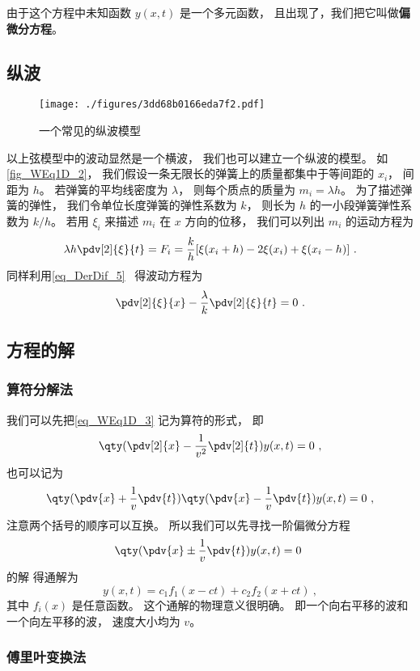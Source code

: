 由于这个方程中未知函数 $y(x,t)$ 是一个多元函数， 且出现了，我们把它叫做\textbf{偏微分方程}。

\subsection{纵波}

\begin{figure}[ht]
\centering
\texttt{[image: ./figures/3dd68b0166eda7f2.pdf]}
\caption{一个常见的纵波模型} \label{fig_WEq1D_2}
\end{figure}

以上弦模型中的波动显然是一个横波， 我们也可以建立一个纵波的模型。 如\autoref{fig_WEq1D_2}， 我们假设一条无限长的弹簧上的质量都集中于等间距的 $x_i$， 间距为 $h$。 若弹簧的平均线密度为 $\lambda$， 则每个质点的质量为 $m_i = \lambda h$。 为了描述弹簧的弹性， 我们令单位长度弹簧的弹性系数为 $k$， 则长为 $h$ 的一小段弹簧弹性系数为 $k/h$。 若用 $\xi_i$ 来描述 $m_i$ 在 $x$ 方向的位移， 我们可以列出 $m_i$ 的运动方程为
\begin{equation}
\lambda h \pdv[2]{\xi}{t} = F_i = \frac kh [\xi(x_i + h) - 2\xi(x_i) + \xi(x_i - h)]~.
\end{equation}
同样利用\autoref{eq_DerDif_5}~ 得波动方程为
\begin{equation}
\pdv[2]{\xi}{x} - \frac{\lambda}{k}\pdv[2]{\xi}{t} = 0~.
\end{equation}

\subsection{方程的解}

\subsubsection{算符分解法}
我们可以先把\autoref{eq_WEq1D_3} 记为算符的形式， 即
\begin{equation}
\qty(\pdv[2]{x} - \frac{1}{v^2}\pdv[2]{t}) y(x, t) = 0~,
\end{equation}
也可以记为
\begin{equation}
\qty(\pdv{x} + \frac{1}{v}\pdv{t})\qty(\pdv{x} - \frac{1}{v}\pdv{t}) y(x, t) = 0~,
\end{equation}
注意两个括号的顺序可以互换。 所以我们可以先寻找一阶偏微分方程
\begin{equation}
\qty(\pdv{x}  \pm\frac{1}{v}\pdv{t})y(x, t)  = 0~
\end{equation}
的解%
得通解为
\begin{equation}
y(x, t) = c_1 f_1(x - ct) + c_2 f_2(x + ct)~,
\end{equation}
其中 $f_i(x)$ 是任意函数。 这个通解的物理意义很明确。 即一个向右平移的波和一个向左平移的波， 速度大小均为 $v$。

\subsubsection{傅里叶变换法}
